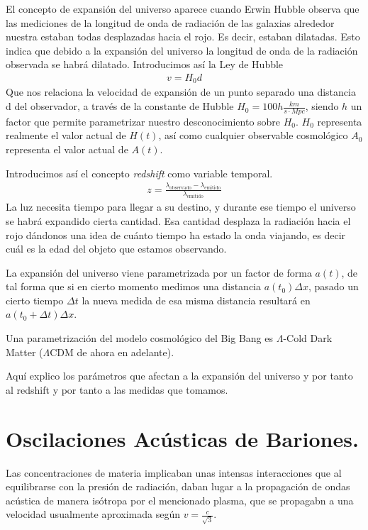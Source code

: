 El concepto de expansión del universo aparece cuando Erwin Hubble observa que las mediciones de la longitud de onda de radiación de las galaxias alrededor nuestra estaban todas desplazadas hacia el rojo. Es decir, estaban dilatadas. Esto indica que debido a la expansión del universo la longitud de onda de la radiación observada se habrá dilatado. Introducimos así la Ley de Hubble 
\begin{align}
	v = H_0 d
	\label{eq:ley-hubble}
\end{align}
Que nos relaciona la velocidad de expansión de un punto separado una distancia d del observador, a través de la constante de Hubble $H_0 = 100h \frac{km}{s \cdot Mpc}$, siendo $h$ un factor que permite parametrizar nuestro desconocimiento sobre $H_0$. $H_0$ representa realmente el valor actual de $H(t)$, así como cualquier observable cosmológico $A_0$ representa el valor actual de $A(t)$. 

Introducimos así el concepto \textit{redshift} como variable temporal.
\begin{align}
	z = \frac{\lambda_{\text{observado}} - \lambda_{\text{emitido}}}{\lambda_{\text{emitido}}}
	\label{eq:redshift}
\end{align}
La luz necesita tiempo para llegar a su destino, y durante ese tiempo el universo se habrá expandido cierta cantidad. Esa cantidad desplaza la radiación hacia el rojo dándonos una idea de cuánto tiempo ha estado la onda viajando, es decir cuál es la edad del objeto que estamos observando.


La expansión del universo viene parametrizada por un factor de forma $a(t)$, de tal forma que si en cierto momento medimos una distancia $a(t_0)\Delta x$, pasado un cierto tiempo $\Delta t$ la nueva medida de esa misma distancia resultará en $a(t_0+\Delta t) \Delta x$. 

Una parametrización del modelo cosmológico del Big Bang es $\Lambda$-Cold Dark Matter ($\Lambda$CDM de ahora en adelante). 

Aquí explico los parámetros que afectan a la expansión del universo y por tanto al redshift y por tanto a las medidas que tomamos.


\section{Oscilaciones Acústicas de Bariones.}
Las concentraciones de materia implicaban unas intensas interacciones que al equilibrarse con la presión de radiación, daban lugar a la propagación de ondas acústica de manera isótropa por el mencionado plasma, que se propagabn a una velocidad usualmente aproximada según $v = \frac{c}{\sqrt{3} }$. 

